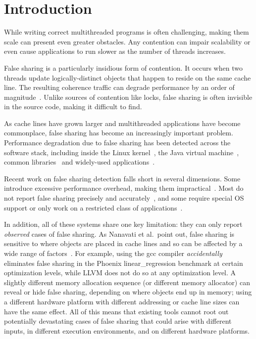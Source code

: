\documentclass[10pt]{sigplanconf}
\begin{document}
\section{Introduction}
\label{sec:intro} 

While writing correct multithreaded programs is often challenging,
making them scale can present even greater obstacles. Any contention can impair scalability or even cause
applications to run slower as the number of threads increases.

False sharing is a particularly insidious form of contention.
It occurs when two threads update logically-distinct objects that happen to reside on the same cache line. The resulting
coherence traffic can degrade performance by an order of
magnitude~\cite{falseshareeffect}. Unlike sources of contention like locks, false sharing is often invisible in the source code, making it difficult to find.

As cache lines have grown larger and multithreaded applications have
become commonplace, false sharing has become an increasingly important
problem. Performance degradation due to false sharing has been detected across the software stack,
including inside the Linux kernel~\cite{OSfalsesharing}, the Java
virtual machine~\cite{JVMfalsesharing}, common
libraries~\cite{libfalsesharing} and widely-used
applications~\cite{mysql,appfalsesharing}.

Recent work on false sharing detection falls short in several dimensions. Some introduce excessive performance overhead, making them impractical~\cite{falseshare:binaryinstrumentation1,falseshare:binaryinstrumentation2,falseshare:simulator}. Most do not report false sharing precisely and accurately~\cite{falseshare:binaryinstrumentation1,detect:ptu,detect:intel,falseshare:binaryinstrumentation2,DProf,qinzhaodetection}, and some require special OS support or only work on a restricted class of applications~\cite{OSdetection,sheriff}.

In addition, all of these systems share one key limitation: they can
only report \emph{observed} cases of false sharing. As Nanavati et al.\ point out, false sharing is sensitive to where objects are placed in cache lines and so can be affected by a wide range of factors~\cite{OSdetection}. For example, using the gcc compiler \emph{accidentally} eliminates false sharing in the Phoenix linear\_regression benchmark at certain optimization levels, while LLVM does not do so at any optimization level.  A slightly different memory allocation sequence (or different memory allocator) can reveal or hide
false sharing, depending on where objects end up in memory; using a different hardware platform with different addressing or cache line sizes can have the same effect. All of this means that existing tools cannot root out potentially devastating cases of false sharing that could arise with different inputs, in different execution environments, and on different hardware platforms.
\end{document}
